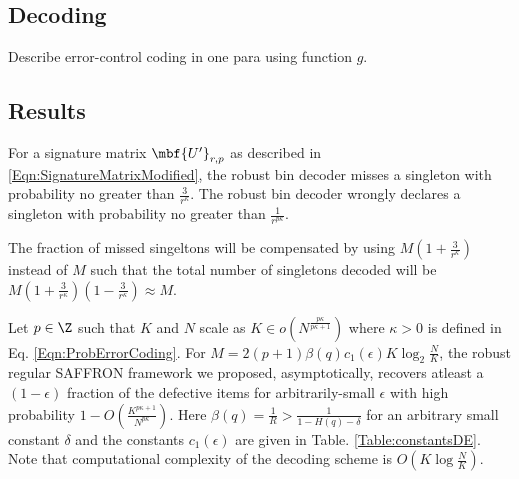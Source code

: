 \documentclass[conference,twocolumn]{IEEEtran}
\begin{document}
\subsection*{Decoding}
Describe error-control coding in one para using function $g$.


\subsection*{Results}
\begin{lemma}
For a signature matrix $\mbf{U'}_{r,p}$ as described in \eqref{Eqn:SignatureMatrixModified}, the robust bin decoder misses a singleton with probability no greater than $\frac{3}{r^{\kappa}}$. The robust bin decoder wrongly declares a singleton with probability no greater than $\frac{1}{r^{p\kappa}}$.
\end{lemma}
The fraction of missed singeltons will be compensated by using $M(1+\frac{3}{r^{\kappa}})$ instead of $M$ such that the total number of singletons decoded will be $M(1+\frac{3}{r^{\kappa}})(1-\frac{3}{r^{\kappa}})\approx M$.

\begin{theorem}
Let $p\in\Z$ such that $K$ and $N$ scale as $K\in o\left(N^{\frac{p\kappa}{p\kappa+1}}\right)$ where $\kappa>0$ is defined in Eq. \eqref{Eqn:ProbErrorCoding}. For $M=2(p+1)\beta(q)c_1(\epsilon)K \log_{2}\frac{N}{K}$, the robust regular SAFFRON framework we proposed, asymptotically, recovers atleast a $(1-\epsilon)$ fraction of the defective items for arbitrarily-small $\epsilon$ with high probability $1-O\left(\frac{K^{p\kappa+1}}{N^{p\kappa}}\right)$. Here $\beta(q)=\frac{1}{R}>\frac{1}{1-H(q)-\delta}$ for an arbitrary small constant $\delta$ and the constants $c_1(\epsilon)$ are given in Table. \ref{Table:constantsDE}. Note that computational complexity of the decoding scheme is $O(K\log \frac{N}{K})$.
\end{theorem}



\end{document}

